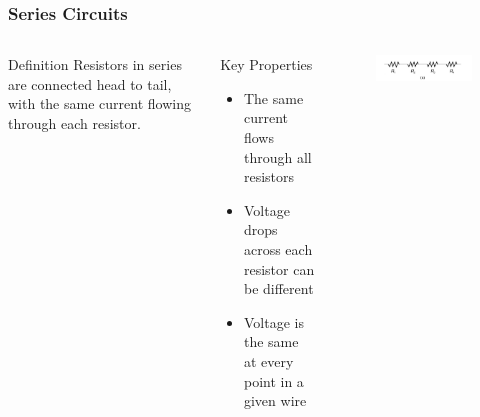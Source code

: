 \documentclass{beamer}
\begin{document}
\begin{frame}
    \frametitle{Series Circuits}
    \begin{columns}
        \begin{block}{Definition}
            Resistors in series are connected head to tail, with the same current flowing through each resistor.
        \end{block}
        
        \begin{block}{Key Properties}
            \begin{itemize}
                \item The same current flows through all resistors
                \item Voltage drops across each resistor can be different
                \item Voltage is the same at every point in a given wire
            \end{itemize}
        \end{block}
        
        \begin{alertblock}{ }
           \begin{figure}
               \centering
               \includegraphics[width=1\linewidth]{serres.png}
           \end{figure}
        \end{alertblock}
    \end{columns}
\end{frame}
\end{document}
